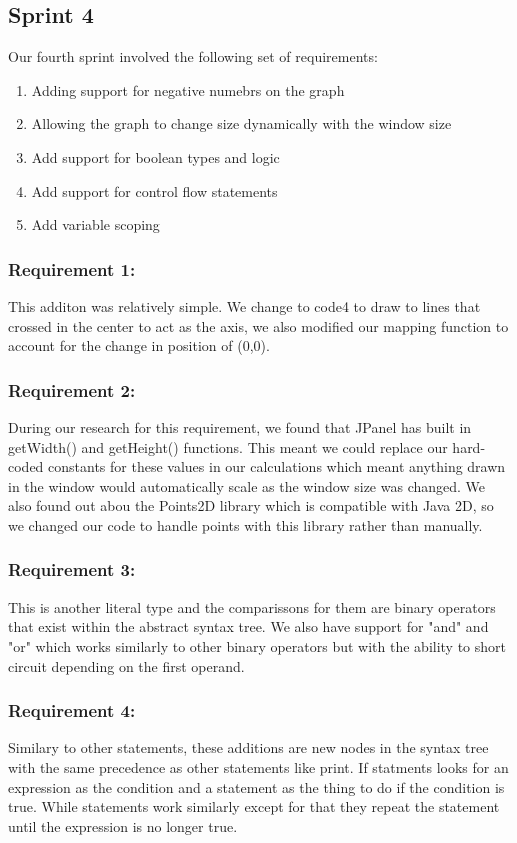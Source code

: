 \documentclass[a4paper, oneside, 11pt]{report}
\begin{document}
\subsection{Sprint 4}
Our fourth sprint involved the following set of requirements:
\begin{enumerate}
\item Adding support for negative numebrs on the graph
\item Allowing the graph to change size dynamically with the window size
\item Add support for boolean types and logic
\item Add support for control flow statements
\item Add variable scoping
\end{enumerate}

\subsubsection{Requirement 1: }
This additon was relatively simple. We change to code4 to draw to lines that crossed in the center to act as the axis, we also modified our mapping function to account for  the change in position of (0,0).
\subsubsection{Requirement 2: }
During our research for this requirement, we found that JPanel has built in getWidth() and getHeight() functions. This meant we could replace our hard-coded constants for these values in our calculations which meant anything drawn in the window would automatically scale as the window size was changed.
We also found out abou the Points2D library which is compatible with Java 2D, so we changed our code to handle points with this library rather than manually.
\subsubsection{Requirement 3: }
This is another literal type and the comparissons for them are binary operators that exist within the abstract syntax tree. We also have support for "and" and "or" which works similarly to other binary operators but with the ability to short circuit depending on the first operand.
\subsubsection{Requirement 4: }
Similary to other statements, these additions are new nodes in the syntax tree with the same precedence as other statements like print. If statments looks for an expression as the condition and a statement as the thing to do if the condition is true. While statements work similarly except for that they repeat the statement until the expression is no longer true.
\end{document}
